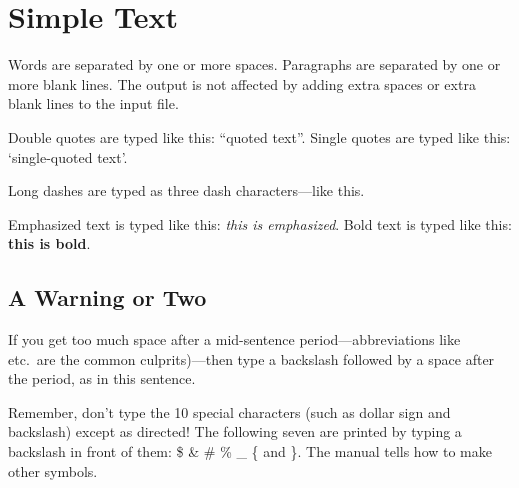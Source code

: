 \documentclass{article}        %
\begin{document}

\section{Simple Text}          %

Words are separated by one or more spaces.  Paragraphs are separated by
one or more blank lines.  The output is not affected by adding extra
spaces or extra blank lines to the input file.

Double quotes are typed like this: ``quoted text''.
Single quotes are typed like this: `single-quoted text'.

Long dashes are typed as three dash characters---like this.

Emphasized text is typed like this: \emph{this is emphasized}.
Bold       text is typed like this: \textbf{this is bold}.

\subsection{A Warning or Two}  %

If you get too much space after a mid-sentence period---abbreviations
like etc.\ are the common culprits)---then type a backslash followed by
a space after the period, as in this sentence.

Remember, don't type the 10 special characters (such as dollar sign and
backslash) except as directed!  The following seven are printed by
typing a backslash in front of them:  \$  \&  \#  \%  \_  \{  and  \}.
The manual tells how to make other symbols.
\end{document}
